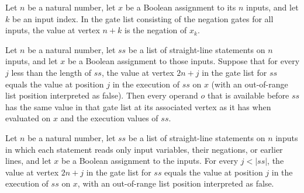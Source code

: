 \begin{theorem}
\label{BoolCircuit.StraightLine.vertexValue_negGates}
\leanok
{}
Let $n$ be a natural number, let $x$ be a Boolean assignment to its $n$ inputs, and let
$k$ be an input index. In the gate list consisting of the negation gates for all inputs,
the value at vertex $n+k$ is the negation of $x_k$.
\end{theorem}

\begin{theorem}
\label{BoolCircuit.StraightLine.vertexValue_operand}
\leanok
{}
Let $n$ be a natural number, let $ss$ be a list of straight-line statements on $n$
inputs, and let $x$ be a Boolean assignment to those inputs. Suppose that for every $j$
less than the length of $ss$, the value at vertex $2n+j$ in the gate list for $ss$
equals the value at position $j$ in the execution of $ss$ on $x$ (with an out-of-range
list position interpreted as false). Then every operand $o$ that is available before
$ss$ has the same value in that gate list at its associated vertex as it has when
evaluated on $x$ and the execution values of $ss$.
\end{theorem}

\begin{theorem}
\label{BoolCircuit.StraightLine.vertexValue_slpGates_line}
\leanok
{}
Let $n$ be a natural number, let $ss$ be a list of straight-line statements on $n$
inputs in which each statement reads only input variables, their negations, or earlier
lines, and let $x$ be a Boolean assignment to the inputs. For every $j<|ss|$, the value
at vertex $2n+j$ in the gate list for $ss$ equals the value at position $j$ in the
execution of $ss$ on $x$, with an out-of-range list position interpreted as false.
\end{theorem}


